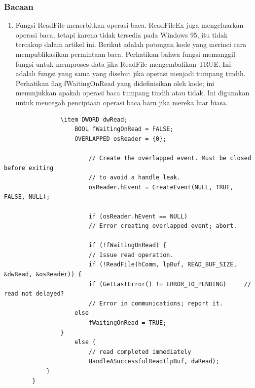 				\subsubsection{Bacaan}
					\begin{enumerate}
						\item Fungsi ReadFile menerbitkan operasi baca. ReadFileEx juga mengeluarkan operasi baca, tetapi karena tidak tersedia pada Windows 95, itu tidak tercakup dalam artikel ini. Berikut adalah potongan kode yang merinci cara mempublikasikan permintaan baca. Perhatikan bahwa fungsi memanggil fungsi untuk memproses data jika ReadFile mengembalikan TRUE. Ini adalah fungsi yang sama yang disebut jika operasi menjadi tumpang tindih. Perhatikan flag fWaitingOnRead yang didefinisikan oleh kode; ini menunjukkan apakah operasi baca tumpang tindih atau tidak. Ini digunakan untuk mencegah penciptaan operasi baca baru jika mereka luar biasa.
					\end{enumerate}
				
				\begin{verbatim}
				\item DWORD dwRead;
					BOOL fWaitingOnRead = FALSE;
					OVERLAPPED osReader = {0};

						// Create the overlapped event. Must be closed before exiting
						// to avoid a handle leak.
						osReader.hEvent = CreateEvent(NULL, TRUE, FALSE, NULL);

						if (osReader.hEvent == NULL)
						// Error creating overlapped event; abort.

						if (!fWaitingOnRead) {
						// Issue read operation.
						if (!ReadFile(hComm, lpBuf, READ_BUF_SIZE, &dwRead, &osReader)) {
						if (GetLastError() != ERROR_IO_PENDING)     // read not delayed?
						// Error in communications; report it.
					else
						fWaitingOnRead = TRUE;
				}
					else {    
						// read completed immediately
						HandleASuccessfulRead(lpBuf, dwRead);
			}
		}
				\end{verbatim}

